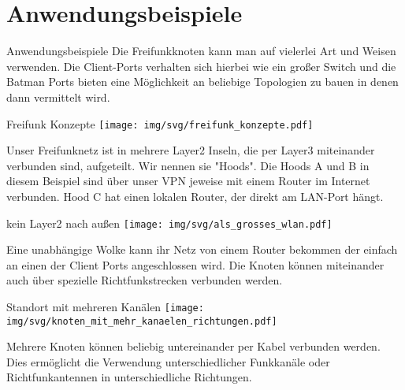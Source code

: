 \section{Anwendungsbeispiele}


\begin{frame}{Anwendungsbeispiele}
	Die Freifunkknoten kann man auf vielerlei Art und Weisen verwenden.
	Die Client-Ports verhalten sich hierbei wie ein großer Switch und die Batman Ports bieten eine Möglichkeit an
	beliebige Topologien zu bauen in denen dann vermittelt wird.
\end{frame}


\begin{frame}{Freifunk Konzepte}
\texttt{[image: img/svg/freifunk\_konzepte.pdf]}

Unser Freifunknetz ist in mehrere Layer2 Inseln, die per Layer3 miteinander verbunden sind, aufgeteilt. Wir nennen sie "Hoods". Die Hoods A und B in diesem Beispiel sind über unser VPN jeweise mit einem Router im Internet verbunden. Hood C hat einen lokalen Router, der direkt am LAN-Port hängt.
\end{frame}

\begin{frame}{kein Layer2 nach außen}
\texttt{[image: img/svg/als\_grosses\_wlan.pdf]}

Eine unabhängige Wolke kann ihr Netz von einem Router bekommen der einfach an einen der Client Ports angeschlossen wird.
Die Knoten können miteinander auch über spezielle Richtfunkstrecken verbunden werden.

\end{frame}


\begin{frame}{Standort mit mehreren Kanälen}
\texttt{[image: img/svg/knoten\_mit\_mehr\_kanaelen\_richtungen.pdf]}

Mehrere Knoten können beliebig untereinander per Kabel verbunden werden. Dies ermöglicht die Verwendung unterschiedlicher Funkkanäle oder Richtfunkantennen in unterschiedliche Richtungen.
\end{frame}

